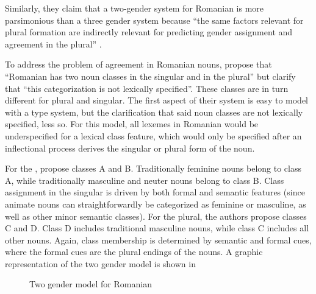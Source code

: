 Similarly, they claim that a two-gender system for Romanian is more parsimonious than a three gender system because ``the same factors relevant for plural formation are indirectly relevant for predicting gender assignment and agreement in the plural'' \autocite[45]{Bateman.2010}.

To address the problem of agreement in Romanian nouns, \textcite[52]{Bateman.2010} propose that ``Romanian has two noun classes in the singular and in the plural'' but clarify that ``this categorization is not lexically specified''. These classes are in turn different for plural and singular. The first aspect of their system is easy to model with a type system, but the clarification that said noun classes are not lexically specified, less so. For this model, all lexemes in Romanian would be underspecified for a lexical class feature, which would only be specified after an inflectional process derives the singular or plural form of the noun.

For the , \textcite{Bateman.2010} propose classes A and B. Traditionally feminine nouns belong to class A, while traditionally masculine and neuter nouns belong to class B. Class assignment in the singular is driven by both formal and semantic features (since animate nouns can straightforwardly be categorized as feminine or masculine, as well as other minor semantic classes). For the plural, the authors propose classes C and D. Class D includes traditional masculine nouns, while class C includes all other nouns. Again, class membership is determined by semantic and formal cues, where the formal cues are the plural endings of the nouns. A graphic representation of the two gender model is shown in 

\begin{figure}
    \caption{Two gender model for Romanian} \label{fig:graphic-two-gender-bateman}
\end{figure}


